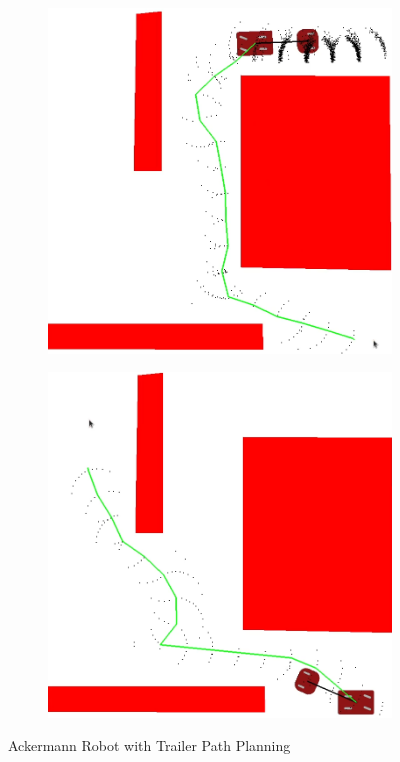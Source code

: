 \documentclass{article}
\begin{document}
\begin{figure}[H]
    \centering
    \begin{subfigure}{0.4\textwidth}
        \centering
        \includegraphics[width = \textwidth]{imgs/path_trailer_1.png}
    \end{subfigure}
    \begin{subfigure}{0.4\textwidth}
        \centering
        \includegraphics[width = \textwidth]{imgs/path_trailer_2.png}
    \end{subfigure}
    \caption{Ackermann Robot with Trailer Path Planning}
    \label{fig:ackermann-trailler-path}
\end{figure}
\end{document}
